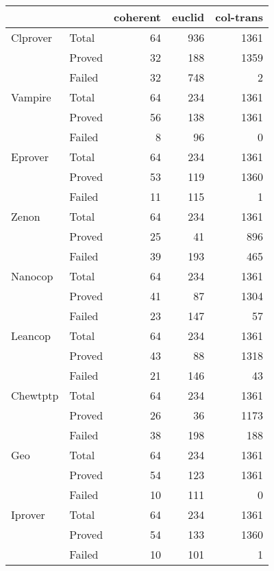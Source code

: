 \documentclass{article}
\begin{document}
\begin{tabular}{llrrr}
\toprule
 &  &  coherent & euclid & col-trans \\
\midrule
Clprover & Total &64 & 936 & 1361 \\
      & Proved & 32 & 188 & 1359 \\
      & Failed & 32 & 748 & 2 \\
Vampire & Total &64 & 234 & 1361 \\
      & Proved & 56 & 138 & 1361 \\
      & Failed & 8 & 96 & 0 \\
Eprover & Total &64 & 234 & 1361 \\
      & Proved & 53 & 119 & 1360 \\
      & Failed & 11 & 115 & 1 \\
Zenon & Total &64 & 234 & 1361 \\
      & Proved & 25 & 41 & 896 \\
      & Failed & 39 & 193 & 465 \\
Nanocop & Total &64 & 234 & 1361 \\
      & Proved & 41 & 87 & 1304 \\
      & Failed & 23 & 147 & 57 \\
Leancop & Total &64 & 234 & 1361 \\
      & Proved & 43 & 88 & 1318 \\
      & Failed & 21 & 146 & 43 \\
Chewtptp & Total &64 & 234 & 1361 \\
      & Proved & 26 & 36 & 1173 \\
      & Failed & 38 & 198 & 188 \\
Geo & Total &64 & 234 & 1361 \\
      & Proved & 54 & 123 & 1361 \\
      & Failed & 10 & 111 & 0 \\
Iprover & Total &64 & 234 & 1361 \\
      & Proved & 54 & 133 & 1360 \\
      & Failed & 10 & 101 & 1 \\
\bottomrule
\end{tabular}
\end{document}
